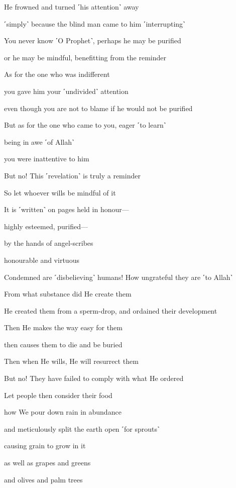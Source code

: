He frowned and turned ˹his attention˺ away

˹simply˺ because the blind man came to him ˹interrupting˺

You never know ˹O Prophet˺, perhaps he may be purified

or he may be mindful, benefitting from the reminder

As for the one who was indifferent

you gave him your ˹undivided˺ attention

even though you are not to blame if he would not be purified

But as for the one who came to you, eager ˹to learn˺

being in awe ˹of Allah˺

you were inattentive to him

But no! This ˹revelation˺ is truly a reminder

So let whoever wills be mindful of it

It is ˹written˺ on pages held in honour—

highly esteemed, purified—

by the hands of angel-scribes

honourable and virtuous

Condemned are ˹disbelieving˺ humans! How ungrateful they are ˹to Allah˺

From what substance did He create them

He created them from a sperm-drop, and ordained their development

Then He makes the way easy for them

then causes them to die and be buried

Then when He wills, He will resurrect them

But no! They have failed to comply with what He ordered

Let people then consider their food

how We pour down rain in abundance

and meticulously split the earth open ˹for sprouts˺

causing grain to grow in it

as well as grapes and greens

and olives and palm trees

